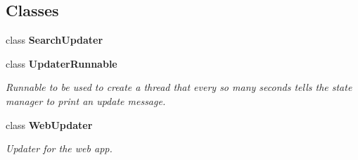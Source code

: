 \subsection*{Classes}
\begin{DoxyCompactItemize}
\item 
class {\bfseries Search\+Updater}
\item 
class {\bfseries Updater\+Runnable}
\begin{DoxyCompactList}\small\item\em Runnable to be used to create a thread that every so many seconds tells the state manager to print an update message. \end{DoxyCompactList}\item 
class {\bfseries Web\+Updater}
\begin{DoxyCompactList}\small\item\em Updater for the web app. \end{DoxyCompactList}\end{DoxyCompactItemize}
